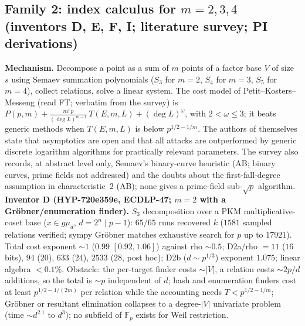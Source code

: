 \documentclass[11pt,a4paper]{article}
\theoremstyle{remark}
\newcommand{\F}{\mathbb{F}}
\begin{document}
\subsection{Family 2: index calculus for $m=2,3,4$ (inventors D, E, F, I; literature survey; PI derivations)}
\textbf{Mechanism.} Decompose a point as a sum of $m$ points of a factor base $V$ of size $s$ using Semaev summation polynomials ($S_3$ for $m=2$, $S_4$ for $m=3$, $S_5$ for $m=4$), collect relations, solve a linear system. The cost model of Petit--Kosters--Messeng \cite{PKM16} (read FT; verbatim from the survey) is $P(p,m)+\frac{m!\,p}{(\deg L)^{m-1}}\,T(E,m,L)+(\deg L)^{\omega}$, with $2<\omega\le3$; it beats generic methods when $T(E,m,L)$ is below $p^{1/2-1/m}$. The authors of \cite{PKM16} themselves state that asymptotics are open and that all attacks are outperformed by generic discrete logarithm algorithms for practically relevant parameters. The survey also records, at abstract level only, Semaev's binary-curve heuristic \cite{Sem15} (AB; binary curves, prime fields not addressed) and the doubts about the first-fall-degree assumption in characteristic~$2$ \cite{HKY15,KY15} (AB); none gives a prime-field sub-$\sqrt p$ algorithm.\\
\textbf{Inventor D (\mbox{HYP-720e359e}, ECDLP-47; $m=2$ with a Gr\"obner/enumeration finder).} $S_3$ decomposition over a PKM multiplicative-coset base ($x\in g\mu_d$, $d=2^n\mid p-1$): $65/65$ runs recovered $k$ ($1581$ sampled relations verified; sympy Gr\"obner matches exhaustive search for $p$ up to $17921$). Total cost exponent $\sim1$ ($0.99$ $[0.92,1.06]$) against rho $\sim0.5$; D2a/rho $=11$ ($16$ bits), $94$ ($20$), $633$ ($24$), $2533$ ($28$, post hoc); D2b ($d\sim p^{1/3}$) exponent $1.075$; linear algebra $<0.1\%$. Obstacle: the per-target finder costs $\sim|V|$, a relation costs $\sim 2p/d$ additions, so the total is $\sim p$ independent of $d$; hash and enumeration finders cost at least $p^{1/2-1/(2m)}$ per relation while the accounting needs $T<p^{1/2-1/m}$; Gr\"obner or resultant elimination collapses to a degree-$|V|$ univariate problem (time $\sim d^{2.1}$ to $d^{3}$); no subfield of $\F_p$ exists for Weil restriction.\\
\end{document}
